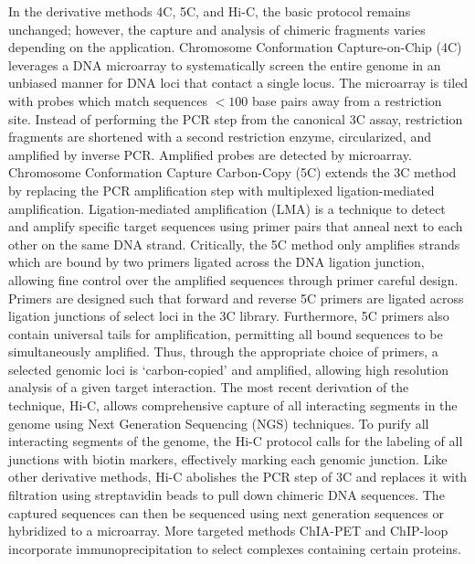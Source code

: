 In the derivative methods 4C, 5C, and Hi-C, the basic protocol remains
unchanged; however, the capture and analysis of chimeric fragments varies
depending on the application.  Chromosome Conformation Capture-on-Chip (4C)
leverages a DNA microarray to systematically screen the entire genome in an
unbiased manner for DNA loci that contact a single locus\cite{simonis2006}.
The microarray is tiled with probes which match sequences $< 100$ base pairs
away from a restriction site.  Instead of performing the PCR step from the
canonical 3C assay, restriction fragments are shortened with a second restriction
enzyme, circularized, and amplified by inverse PCR\@.  Amplified probes
are detected by microarray\cite{simonis2006}.  Chromosome Conformation Capture Carbon-Copy (5C)
extends the 3C method by replacing the PCR amplification step with multiplexed
ligation-mediated amplification.  Ligation-mediated amplification (LMA) is a
technique to detect and amplify specific target sequences using primer pairs
that anneal next to each other on the same DNA strand\cite{dostie2006}.
Critically, the 5C method only amplifies strands which are bound by two
primers ligated across the DNA ligation junction, allowing fine control over
the amplified sequences through primer careful design.  Primers are
designed such that forward and reverse 5C primers are ligated across ligation
junctions of select loci in the 3C library.
Furthermore, 5C primers also contain universal tails for amplification,
permitting all bound sequences to be simultaneously amplified.  Thus, through
the appropriate choice of primers, a selected genomic loci is `carbon-copied'
and amplified, allowing high resolution analysis of a given target
interaction\cite{dostie2006}.  The most recent derivation of the technique,
Hi-C, allows comprehensive capture of all interacting segments in the genome
using Next Generation Sequencing (NGS) techniques.  To purify all interacting
segments of the genome, the Hi-C protocol calls for the labeling of all junctions
with biotin markers, effectively marking each genomic junction. Like other
derivative methods, Hi-C abolishes the PCR step of 3C and replaces it with filtration
using streptavidin beads to pull down chimeric DNA sequences.  The captured sequences
can then be sequenced using next generation sequences or hybridized to a
microarray.  More targeted methods ChIA-PET and ChIP-loop incorporate
immunoprecipitation to select complexes containing certain proteins.


